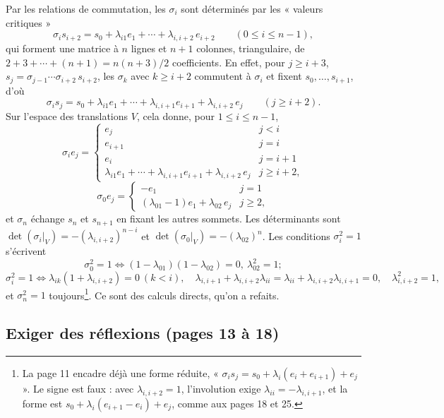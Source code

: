 \documentclass[11pt,a4paper]{article}
\begin{document}
Par les relations de commutation, les $\sigma_i$ sont déterminés par les
« valeurs critiques »
\[
\sigma_i s_{i+2} = s_0 + \lambda_{i1} e_1 + \cdots + \lambda_{i,i+2}\, e_{i+2}
\qquad (0 \leq i \leq n-1) ,
\]
qui forment une matrice à $n$ lignes et $n + 1$ colonnes, triangulaire, de
$2 + 3 + \cdots + (n+1) = n(n+3)/2$ coefficients. En effet, pour $j \geq i + 3$,
$s_j = \sigma_{j-1} \cdots \sigma_{i+2}\, s_{i+2}$, les $\sigma_k$ avec $k \geq
i + 2$ commutent à $\sigma_i$ et fixent $s_0, \dots, s_{i+1}$, d'où
\[
\sigma_i s_j = s_0 + \lambda_{i1} e_1 + \cdots + \lambda_{i,i+1} e_{i+1} +
\lambda_{i,i+2}\, e_j \qquad (j \geq i + 2) .
\]
Sur l'espace des translations $V$, cela donne, pour $1 \leq i \leq n-1$,
\[
\sigma_i e_j =
\begin{cases}
e_j & j < i \\
e_{i+1} & j = i \\
e_i & j = i + 1 \\
\lambda_{i1} e_1 + \cdots + \lambda_{i,i+1} e_{i+1} + \lambda_{i,i+2}\, e_j & j \geq i + 2 ,
\end{cases}
\]
\[
\sigma_0 e_j =
\begin{cases}
-e_1 & j = 1 \\
(\lambda_{01} - 1) e_1 + \lambda_{02}\, e_j & j \geq 2 ,
\end{cases}
\]
et $\sigma_n$ échange $s_n$ et $s_{n+1}$ en fixant les autres sommets. Les
déterminants sont $\det(\sigma_i|_V) = -(\lambda_{i,i+2})^{n-i}$ et
$\det(\sigma_0|_V) = -(\lambda_{02})^n$. Les conditions $\sigma_i^2 = 1$
s'écrivent
\[
\sigma_0^2 = 1 \iff (1 - \lambda_{01})(1 - \lambda_{02}) = 0,\ \lambda_{02}^2 = 1 ;
\]
\[
\sigma_i^2 = 1 \iff
\lambda_{ik}(1 + \lambda_{i,i+2}) = 0\ (k < i),\quad
\lambda_{i,i+1} + \lambda_{i,i+2}\lambda_{ii} = \lambda_{ii} + \lambda_{i,i+2}
\lambda_{i,i+1} = 0,\quad \lambda_{i,i+2}^2 = 1 ,
\]
et $\sigma_n^2 = 1$ toujours\footnote{La page 11 encadre déjà une forme réduite,
« $\sigma_i s_j = s_0 + \lambda_i(e_i + e_{i+1}) + e_j$ ». Le signe est faux :
avec $\lambda_{i,i+2} = 1$, l'involution exige $\lambda_{ii} = -\lambda_{i,i+1}$,
et la forme est $s_0 + \lambda_i(e_{i+1} - e_i) + e_j$, comme aux pages 18 et
25.}. Ce sont des calculs directs, qu'on a refaits.

\subsection*{Exiger des réflexions (pages 13 à 18)}
\end{document}
